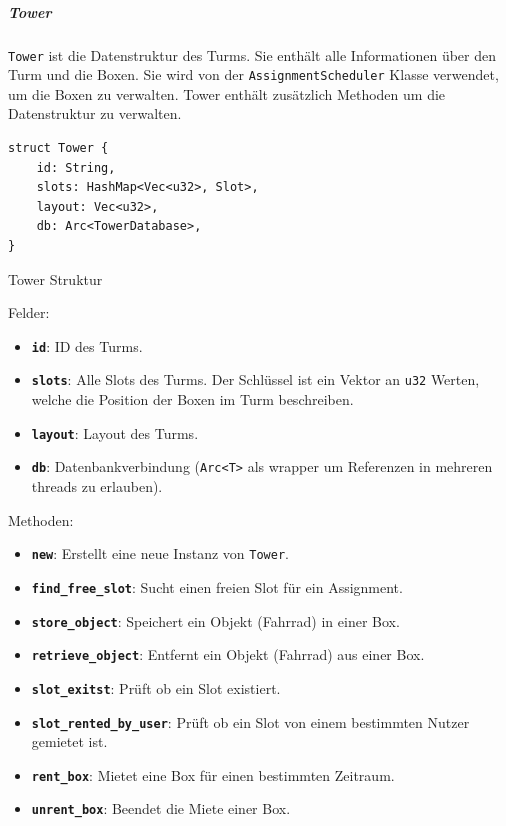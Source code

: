 \subparagraph{Tower}

\texttt{Tower} ist die Datenstruktur des Turms. Sie enthält alle Informationen über den Turm und die Boxen. Sie wird von der \texttt{AssignmentScheduler} Klasse verwendet, um die Boxen zu verwalten. Tower enthält zusätzlich Methoden um die Datenstruktur zu verwalten.

\begin{listing}[H]
  \begin{verbatim}
struct Tower {
    id: String,
    slots: HashMap<Vec<u32>, Slot>,
    layout: Vec<u32>,
    db: Arc<TowerDatabase>,
}
\end{verbatim}
  \caption{Tower Struktur}
  \label{lst:tower_struktur}
\end{listing}

Felder:
\begin{itemize}
  \item \textbf{\texttt{id}}: ID des Turms.
  \item \textbf{\texttt{slots}}: Alle Slots des Turms. Der Schlüssel ist ein Vektor an \texttt{u32} Werten, welche die Position der Boxen im Turm beschreiben.
  \item \textbf{\texttt{layout}}: Layout des Turms.
  \item \textbf{\texttt{db}}: Datenbankverbindung (\texttt{Arc<T>} als \Gls{wrapper} um Referenzen in mehreren \Glspl{thread} zu erlauben).
\end{itemize}

Methoden:
\begin{itemize}
  \item \textbf{\texttt{new}}: Erstellt eine neue Instanz von \texttt{Tower}.
  \item \textbf{\texttt{find\_free\_slot}}: Sucht einen freien Slot für ein Assignment.
  \item \textbf{\texttt{store\_object}}: Speichert ein Objekt (Fahrrad) in einer Box.
  \item \textbf{\texttt{retrieve\_object}}: Entfernt ein Objekt (Fahrrad) aus einer Box.
  \item \textbf{\texttt{slot\_exitst}}: Prüft ob ein Slot existiert.
  \item \textbf{\texttt{slot\_rented\_by\_user}}: Prüft ob ein Slot von einem bestimmten Nutzer gemietet ist.
  \item \textbf{\texttt{rent\_box}}: Mietet eine Box für einen bestimmten Zeitraum.
        \item\textbf{\texttt{unrent\_box}}: Beendet die Miete einer Box.
\end{itemize}


